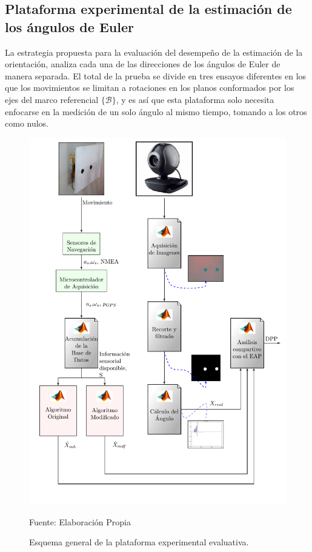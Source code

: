 \documentclass[10pt]{report}
\numberwithin{equation}{chapter}
\numberwithin{algorithm}{chapter}
\newcommand{\marco}[1]{\{\mathcal{#1}\}}
\begin{document}
\subsection{Plataforma experimental de la estimación de los ángulos de Euler}\label{Plataforma2}
La estrategia propuesta para la evaluación del desempeño de la estimación de la orientación, analiza cada una de las direcciones de los ángulos de Euler de manera separada. El total de la prueba se divide en tres ensayos diferentes en los que los movimientos se limitan a rotaciones en los planos conformados por los ejes del marco referencial $\marco{B}$, y es así que esta plataforma solo necesita enfocarse en la medición de un solo ángulo al mismo tiempo, tomando a los otros como nulos.\par
\begin{figure}
\centering
\includegraphics[width=\textwidth]{plataforma_fig10.pdf}
\caption{Esquema general de la plataforma experimental evaluativa.}
\scriptsize{Fuente: Elaboración Propia}
\label{plataforma_fig10}
\end{figure}
\end{document}
